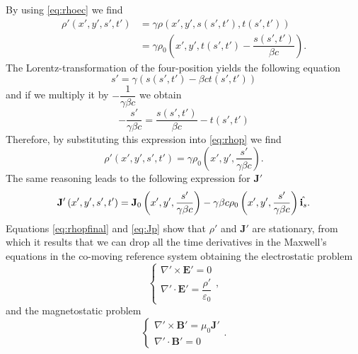 By using \ref{eq:rhoec} we find
\begin{equation}
    \begin{split}
        \rho'(x', y', s', t')&=\gamma \rho(x',y',s(s',t'),t(s',t'))\\
        &=\gamma\rho_0\left(x', y', t(s',t') - \dfrac{s(s',t')}{\beta c} \right).\label{eq:rhop}
    \end{split}
\end{equation}
The Lorentz-transformation of the four-position yields the following equation
\begin{equation*}
    s' = \gamma \left( s(s', t') - \beta c t(s', t') \right)
\end{equation*}
and if we multiply it by $-\dfrac{1}{\gamma \beta c}$ we obtain
\begin{equation*}
    -\dfrac{s'}{\gamma \beta c} = \dfrac{s(s', t')}{\beta c} -t(s', t')
\end{equation*}
Therefore, by substituting this expression into \ref{eq:rhop} we find
\begin{equation}
    \rho'\left(x', y', s', t'\right) = \gamma \rho_0\left(x', y', \frac{s'}{\gamma \beta c}\right).
    \label{eq:rhopfinal}
\end{equation}
The same reasoning leads to the following expression for $\mathbf{J}'$ 
\begin{equation}
    \mathbf{J'}\left(x', y', s', t'\right) = \mathbf{J}_0\left(x', y', \frac{s'}{\gamma \beta c}\right) -  \gamma \beta c \rho_0\left(x', y', \frac{s'}{\gamma \beta c}\right) \hat{\mathbf{i}_s}.\\
    \label{eq:Jp}
\end{equation}
Equations \ref{eq:rhopfinal} and \ref{eq:Jp} show that $\rho'$ and $\mathbf{J}'$ are stationary, from which it results that we can drop all the time derivatives in the Maxwell's equations in the co-moving reference system obtaining the electrostatic problem
\begin{equation*}
    \begin{cases}
        \nabla'\times \mathbf{E}' = 0\\
        \nabla' \cdot \mathbf{E}' = \dfrac{\rho'}{\varepsilon_0}
    \end{cases},
\end{equation*}
and the magnetostatic problem
\begin{equation*}
    \begin{cases}
        \nabla'\times \mathbf{B}' = \mu_0 \mathbf{J}'\\
        \nabla' \cdot \mathbf{B}' = 0
    \end{cases}.
\end{equation*}
